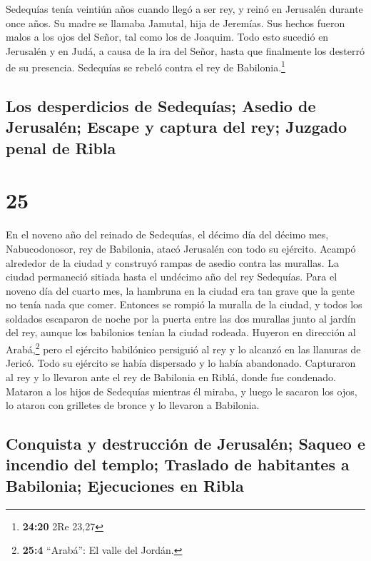  Sedequías tenía veintiún años cuando llegó a ser rey, y
reinó en Jerusalén durante once años. Su madre se llamaba Jamutal, hija
de Jeremías.  Sus hechos fueron malos a los ojos del
Señor, tal como los de Joaquim.  Todo esto sucedió en
Jerusalén y en Judá, a causa de la ira del Señor, hasta que finalmente
los desterró de su presencia. Sedequías se rebeló contra el rey de
Babilonia.\footnote{\textbf{24:20} 2Re 23,27}

\hypertarget{los-desperdicios-de-sedequuxedas-asedio-de-jerusaluxe9n-escape-y-captura-del-rey-juzgado-penal-de-ribla}{%
\subsection{Los desperdicios de Sedequías; Asedio de Jerusalén; Escape y
captura del rey; Juzgado penal de
Ribla}\label{los-desperdicios-de-sedequuxedas-asedio-de-jerusaluxe9n-escape-y-captura-del-rey-juzgado-penal-de-ribla}}

\hypertarget{section-24}{%
\section{25}\label{section-24}}

 En el noveno año del reinado de Sedequías, el décimo día
del décimo mes, Nabucodonosor, rey de Babilonia, atacó Jerusalén con
todo su ejército. Acampó alrededor de la ciudad y construyó rampas de
asedio contra las murallas.  La ciudad permaneció sitiada
hasta el undécimo año del rey Sedequías.  Para el noveno
día del cuarto mes, la hambruna en la ciudad era tan grave que la gente
no tenía nada que comer.  Entonces se rompió la muralla de
la ciudad, y todos los soldados escaparon de noche por la puerta entre
las dos murallas junto al jardín del rey, aunque los babilonios tenían
la ciudad rodeada. Huyeron en dirección al Arabá,\footnote{\textbf{25:4}
  ``Arabá'': El valle del Jordán.}  pero el ejército
babilónico persiguió al rey y lo alcanzó en las llanuras de Jericó. Todo
su ejército se había dispersado y lo había abandonado. 
Capturaron al rey y lo llevaron ante el rey de Babilonia en Riblá, donde
fue condenado.  Mataron a los hijos de Sedequías mientras
él miraba, y luego le sacaron los ojos, lo ataron con grilletes de
bronce y lo llevaron a Babilonia.

\hypertarget{conquista-y-destrucciuxf3n-de-jerusaluxe9n-saqueo-e-incendio-del-templo-traslado-de-habitantes-a-babilonia-ejecuciones-en-ribla}{%
\subsection{Conquista y destrucción de Jerusalén; Saqueo e incendio del
templo; Traslado de habitantes a Babilonia; Ejecuciones en
Ribla}\label{conquista-y-destrucciuxf3n-de-jerusaluxe9n-saqueo-e-incendio-del-templo-traslado-de-habitantes-a-babilonia-ejecuciones-en-ribla}}

